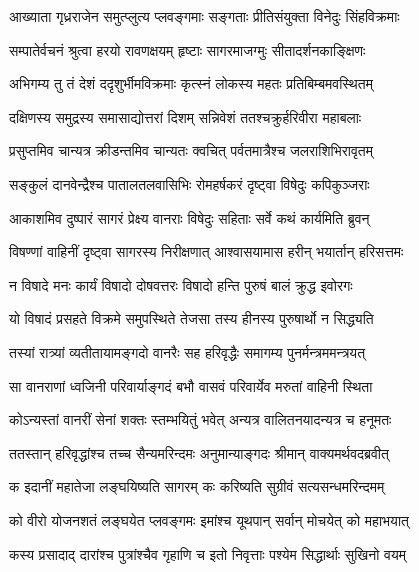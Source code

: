 
\twolineshloka
{आख्याता गृध्रराजेन समुत्प्लुत्य प्लवङ्गमाः}
{सङ्गताः प्रीतिसंयुक्ता विनेदुः सिंहविक्रमाः} %

\twolineshloka
{सम्पातेर्वचनं श्रुत्वा हरयो रावणक्षयम्}
{हृष्टाः सागरमाजग्मुः सीतादर्शनकाङ्क्षिणः} %

\twolineshloka
{अभिगम्य तु तं देशं ददृशुर्भीमविक्रमाः}
{कृत्स्नं लोकस्य महतः प्रतिबिम्बमवस्थितम्} %

\twolineshloka
{दक्षिणस्य समुद्रस्य समासाद्योत्तरां दिशम्}
{सन्निवेशं ततश्चक्रुर्हरिवीरा महाबलाः} %

\twolineshloka
{प्रसुप्तमिव चान्यत्र क्रीडन्तमिव चान्यतः}
{क्वचित् पर्वतमात्रैश्च जलराशिभिरावृतम्} %

\twolineshloka
{सङ्कुलं दानवेन्द्रैश्च पातालतलवासिभिः}
{रोमहर्षकरं दृष्ट्वा विषेदुः कपिकुञ्जराः} %

\twolineshloka
{आकाशमिव दुष्पारं सागरं प्रेक्ष्य वानराः}
{विषेदुः सहिताः सर्वे कथं कार्यमिति ब्रुवन्} %

\twolineshloka
{विषण्णां वाहिनीं दृष्ट्वा सागरस्य निरीक्षणात्}
{आश्वासयामास हरीन् भयार्तान् हरिसत्तमः} %

\twolineshloka
{न विषादे मनः कार्यं विषादो दोषवत्तरः}
{विषादो हन्ति पुरुषं बालं क्रुद्ध इवोरगः} %

\twolineshloka
{यो विषादं प्रसहते विक्रमे समुपस्थिते}
{तेजसा तस्य हीनस्य पुरुषार्थो न सिद्ध्यति} %

\twolineshloka
{तस्यां रात्र्यां व्यतीतायामङ्गदो वानरैः सह}
{हरिवृद्धैः समागम्य पुनर्मन्त्रममन्त्रयत्} %

\twolineshloka
{सा वानराणां ध्वजिनी परिवार्याङ्गदं बभौ}
{वासवं परिवार्येव मरुतां वाहिनी स्थिता} %

\twolineshloka
{कोऽन्यस्तां वानरीं सेनां शक्तः स्तम्भयितुं भवेत्}
{अन्यत्र वालितनयादन्यत्र च हनूमतः} %

\twolineshloka
{ततस्तान् हरिवृद्धांश्च तच्च सैन्यमरिन्दमः}
{अनुमान्याङ्गदः श्रीमान् वाक्यमर्थवदब्रवीत्} %

\twolineshloka
{क इदानीं महातेजा लङ्घयिष्यति सागरम्}
{कः करिष्यति सुग्रीवं सत्यसन्धमरिन्दमम्} %

\twolineshloka
{को वीरो योजनशतं लङ्घयेत प्लवङ्गमः}
{इमांश्च यूथपान् सर्वान् मोचयेत् को महाभयात्} %

\twolineshloka
{कस्य प्रसादाद् दारांश्च पुत्रांश्चैव गृहाणि च}
{इतो निवृत्ताः पश्येम सिद्धार्थाः सुखिनो वयम्} %

